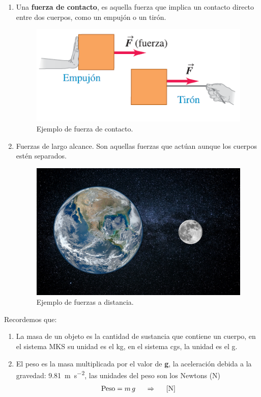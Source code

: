 \documentclass[14pt]{extarticle}
\newcommand{\textocolor}[2]{\textbf{\textcolor{#1}{#2}}}
\begin{document}
\begin{enumerate}
\item Una \textocolor{cobalt}{fuerza de contacto}, es aquella fuerza que implica un contacto directo entre dos cuerpos, como un empujón o un tirón.
\begin{figure}[H]
    \centering
    \includegraphics[scale=0.8]{Imagenes/Fuerza_01.png}
    \caption{Ejemplo de fuerza de contacto.}
\end{figure}
\item \textcolor{ao(english)}{Fuerzas de largo alcance.} Son aquellas fuerzas que actúan aunque los cuerpos estén separados.
\begin{figure}[H]
    \centering
    \includegraphics[scale=1.3]{Imagenes/Fuerza_09.jpg}
    \caption{Ejemplo de fuerzas a distancia.}
\end{figure}
\end{enumerate}

Recordemos que:
\begin{enumerate}
\item La masa de un objeto es la cantidad de sustancia que contiene un cuerpo, en el sistema MKS su unidad es el \unit{\kilo\gram}, en el sistema cgs, la unidad es el \unit{\gram}.
\item El peso  es la masa multiplicada por el valor de \textbf{g}, la aceleración debida a la gravedad: \SI{9.81}{\meter\per\square\second}, las unidades del peso son los Newtons (\unit{\newton})
\begin{align*}
\text{Peso} = m \, g \hspace{0.5cm} \Rightarrow \hspace{0.5cm} \left[ \unit{\newton} \right]
\end{align*}
\end{enumerate}
\end{document}
